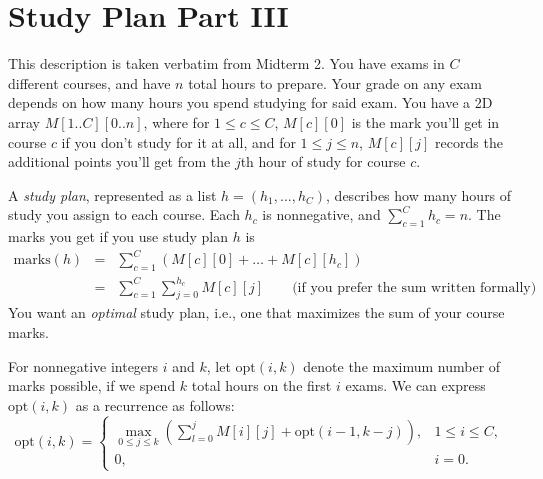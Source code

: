 \documentclass[11pt]{article}
\newcommand{\opt}{\mbox{opt}}
\newcommand{\finalmarks}{\mbox{marks}}
\begin{document}
\section{Study Plan Part III}

This description is taken verbatim from Midterm 2. You have exams in $C$ different courses, and have $n$ total hours to prepare.  Your grade on any exam depends on how many hours you spend studying for said exam. You have a 2D array $M[1..C][0..n]$, where for $1 \le c \le C$, $M[c][0]$ is the mark you'll get in course $c$ if you don't study for it at all, and for $1\le j \le n$, $M[c][j]$ records the additional points you'll get from the $j$th hour of study for course $c$.

A {\em study plan}, represented as a list $h = (h_1,\ldots, h_C)$, describes how many hours of study you assign to each course. Each $h_c$ is nonnegative, and
    $\sum_{c=1}^C h_c = n$.
The marks you get if you use study plan $h$ is
\begin{eqnarray*}
\finalmarks(h) & = & \sum_{c=1}^C (M[c][0] + \ldots + M[c][h_c]) \\
 & = & \sum_{c=1}^C \sum_{j=0}^{h_c} M[c][j] \quad\quad \mbox{(if you prefer the sum written formally)}
\end{eqnarray*}
You want an {\em optimal} study plan, i.e., one that maximizes the sum of your course marks.

For nonnegative integers $i$ and $k$, 
let $\opt(i,k)$ denote the maximum number of marks possible,
if we spend $k$ total hours on the first $i$ exams. We can express $\opt(i,k)$ as a recurrence as follows:
\[
\opt(i,k) = \left\{
\begin{array}{ll}
\max_{0 \le j \le k} (\sum_{l=0}^j M[i][j] + \opt(i-1,k-j)), & 1\le i \le C, \\
0, & i = 0.
\end{array}
\right.
\]
\end{document}

